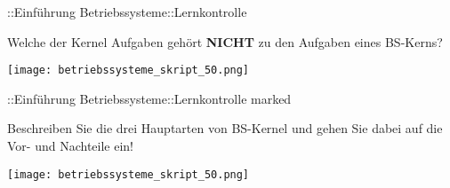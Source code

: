 \documentclass{article}
\begin{document}
\begin{tcolorbox}[colback=white!10!white,colframe=lightgray!75!black,
  savelowerto=\jobname_ex.tex]

\begin{center}
::Einführung Betriebssysteme::Lernkontrolle

\end{center}

\tcblower

\justifying

\end{tcolorbox}
\begin{tcolorbox}[colback=white!10!white,colframe=lightgray!75!black,
  savelowerto=\jobname_ex.tex]

\begin{center}
Welche der Kernel Aufgaben gehört 
\textbf{NICHT
} zu den Aufgaben eines BS-Kerns?

\end{center}

\tcblower

\justifying
\texttt{[image: betriebssysteme\_skript\_50.png]}

\end{tcolorbox}
\begin{tcolorbox}[colback=white!10!white,colframe=lightgray!75!black,
  savelowerto=\jobname_ex.tex]

\begin{center}
::Einführung Betriebssysteme::Lernkontrolle marked

\end{center}

\tcblower

\justifying

\end{tcolorbox}
\begin{tcolorbox}[colback=white!10!white,colframe=lightgray!75!black,
  savelowerto=\jobname_ex.tex]

\begin{center}
Beschreiben Sie die drei Hauptarten von BS-Kernel und gehen Sie dabei auf die Vor- und Nachteile ein!

\end{center}

\tcblower

\justifying
\texttt{[image: betriebssysteme\_skript\_50.png]}

\end{tcolorbox}
\end{document}
